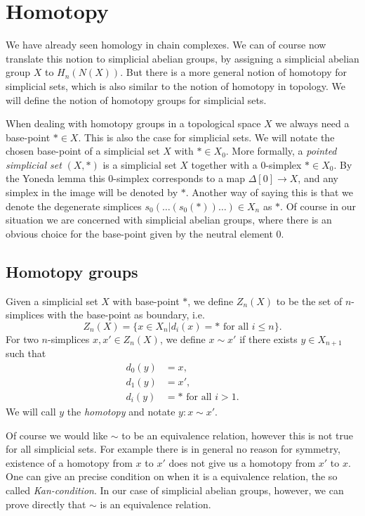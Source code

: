 \section{Homotopy}
\label{sec:Homotopy}

We have already seen homology in chain complexes. We can of course now translate this notion to simplicial abelian groups, by assigning a simplicial abelian group $X$ to $H_n(N(X))$. But there is a more general notion of homotopy for simplicial sets, which is also similar to the notion of homotopy in topology. We will define the notion of homotopy groups for simplicial sets.

When dealing with homotopy groups in a topological space $X$ we always need a base-point $\ast \in X$. This is also the case for simplicial sets. We will notate the chosen base-point of a simplicial set $X$ with $\ast \in X_0$. More formally, a \emph{pointed simplicial set} $(X, \ast)$ is a simplicial set $X$ together with a $0$-simplex $\ast \in X_0$. By the Yoneda lemma this $0$-simplex corresponds to a map $\Delta[0] \to X$, and any simplex in the image will be denoted by $\ast$. Another way of saying this is that we denote the degenerate simplices $s_0(\ldots(s_0(\ast))\ldots) \in X_n$ as $\ast$. Of course in our situation we are concerned with simplicial abelian groups, where there is an obvious choice for the base-point given by the neutral element $0$.

\subsection{Homotopy groups}
\begin{definition}
	Given a simplicial set $X$ with base-point $\ast$, we define $Z_n(X)$ to be the set of $n$-simplices with the base-point as boundary, i.e.
	$$ Z_n(X) = \{ x \in X_n | d_i(x) = \ast \text{ for all } i \leq n \}. $$
	For two $n$-simplices $x, x' \in Z_n(X)$, we define $x \sim x'$ if there exists $y \in X_{n+1}$ such that
	\begin{align}
		d_0(y) &= x, \\
		d_1(y) &= x', \\
		d_i(y) &= \ast \text{ for all } i > 1.
	\end{align}
	We will call $y$ the \emph{homotopy} and notate $y: x \sim x'$.
\end{definition}

Of course we would like $\sim$ to be an equivalence relation, however this is not true for all simplicial sets. For example there is in general no reason for symmetry, existence of a homotopy from $x$ to $x'$ does not give us a homotopy from $x'$ to $x$. One can give an precise condition on when it is a equivalence relation, the so called \emph{Kan-condition}. In our case of simplicial abelian groups, however, we can prove directly that $\sim$ is an equivalence relation.

